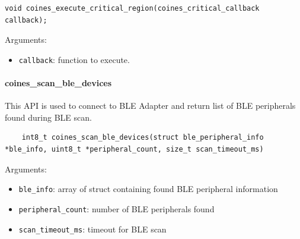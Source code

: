 \begin{lstlisting}
void coines_execute_critical_region(coines_critical_callback callback);
\end{lstlisting}

Arguments:
\begin{itemize}
	\item \texttt{callback}: function to execute.
\end{itemize}

\paragraph{coines\_scan\_ble\_devices}\label{coinesScanBleDevices}
This API is used to connect to BLE Adapter and return list of BLE peripherals found during BLE scan.

\begin{lstlisting}
	int8_t coines_scan_ble_devices(struct ble_peripheral_info *ble_info, uint8_t *peripheral_count, size_t scan_timeout_ms)
\end{lstlisting}

Arguments:
\begin{itemize}
	\item \texttt{ble\_info}: array of struct containing found BLE peripheral information
	\item \texttt{peripheral\_count}: number of BLE peripherals found
	\item \texttt{scan\_timeout\_ms}: timeout for BLE scan
\end{itemize}

\newpage
